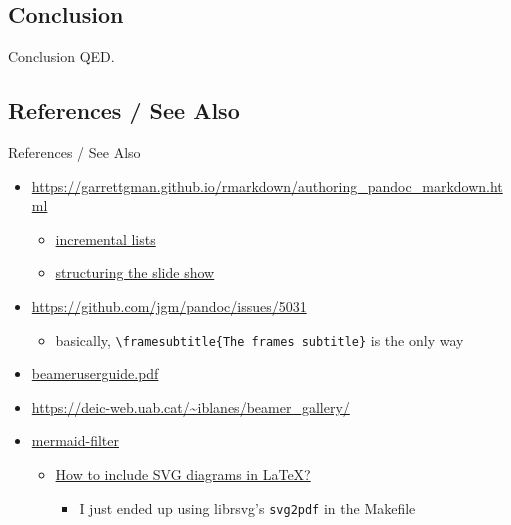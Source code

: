 \documentclass[
  ignorenonframetext,
  aspectratio=169,
]{beamer}
\providecommand{\tightlist}{%
  \setlength{\itemsep}{0pt}\setlength{\parskip}{0pt}}
\begin{document}

\hypertarget{conclusion}{%
\subsection{Conclusion}\label{conclusion}}

\begin{frame}{Conclusion}
QED.
\end{frame}

\hypertarget{references-see-also}{%
\subsection{References / See Also}\label{references-see-also}}

\begin{frame}[fragile]{References / See Also}
\begin{itemize}
\tightlist
\item
  \url{https://garrettgman.github.io/rmarkdown/authoring_pandoc_markdown.html}

  \begin{itemize}
  \tightlist
  \item
    \href{https://garrettgman.github.io/rmarkdown/authoring_pandoc_markdown.html\#incremental_lists}{incremental
    lists}
  \item
    \href{https://garrettgman.github.io/rmarkdown/authoring_pandoc_markdown.html\#structuring_the_slide_show}{structuring
    the slide show}
  \end{itemize}
\item
  \url{https://github.com/jgm/pandoc/issues/5031}

  \begin{itemize}
  \tightlist
  \item
    basically,
    \texttt{\textbackslash{}framesubtitle\{The\ frame\textquotesingle{}s\ subtitle\}}
    is the only way
  \end{itemize}
\item
  \href{http://ctan.math.utah.edu/ctan/tex-archive/macros/latex/contrib/beamer/doc/beameruserguide.pdf}{beameruserguide.pdf}
\item
  \url{https://deic-web.uab.cat/~iblanes/beamer_gallery/}
\item
  \href{https://github.com/raghur/mermaid-filter}{mermaid-filter}

  \begin{itemize}
  \tightlist
  \item
    \href{https://tex.stackexchange.com/a/2107}{How to include SVG
    diagrams in LaTeX?}

    \begin{itemize}
    \tightlist
    \item
      I just ended up using librsvg's \texttt{svg2pdf} in the Makefile
    \end{itemize}
  \end{itemize}
\end{itemize}
\end{frame}
\end{document}
